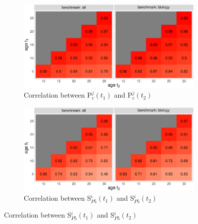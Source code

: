 \begin{figure}[ht!]
    \centering
    \begin{subfigure}[b]{0.8\textwidth}
        \centering
             \includegraphics[width=\textwidth]{figures/pred_power/heatmap_cor_pub.eps}
         \caption{Correlation between P$_c^{j}(t_1)$ and P$_c^{j}(t_2)$}
         \label{fig:hm_rp_pub}
    \end{subfigure}

    \begin{subfigure}[b]{0.8\textwidth}
        \centering
             \includegraphics[width=\textwidth]{figures/pred_power/heatmap_cor_aut.eps}
         \caption{Correlation between S$_{P5}^{i}(t_1)$ and S$_{P5}^{i}(t_2)$}
         \label{fig:hm_rp_aut}
    \end{subfigure}


\end{figure}
